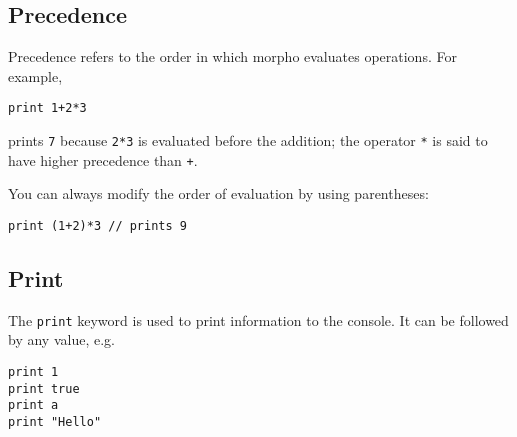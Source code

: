 \hypertarget{precedence}{%
\subsection{Precedence}\label{precedence}}

Precedence refers to the order in which morpho evaluates operations. For
example,

\begin{lstlisting}
print 1+2*3
\end{lstlisting}

prints \texttt{7} because \texttt{2*3} is evaluated before the addition;
the operator \texttt{*} is said to have higher precedence than
\texttt{+}.

You can always modify the order of evaluation by using parentheses:

\begin{lstlisting}
print (1+2)*3 // prints 9
\end{lstlisting}

\hypertarget{print}{%
\subsection{Print}\label{print}}

The \texttt{print} keyword is used to print information to the console.
It can be followed by any value, e.g.

\begin{lstlisting}
print 1
print true
print a
print "Hello"
\end{lstlisting}
